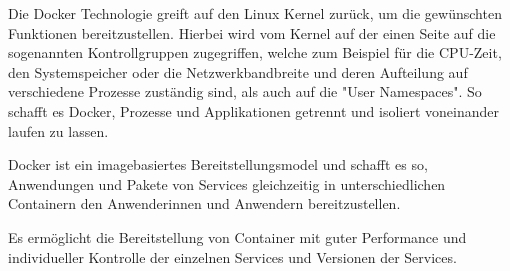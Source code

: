 \label{sec:dockerexplained}

Die Docker Technologie greift auf den Linux Kernel zurück, um die gewünschten Funktionen bereitzustellen. Hierbei wird vom Kernel auf der einen Seite auf die sogenannten Kontrollgruppen zugegriffen, welche zum Beispiel für die CPU-Zeit, den Systemspeicher oder die Netzwerkbandbreite und deren Aufteilung auf verschiedene Prozesse zuständig sind, als auch auf die "User Namespaces". So schafft es Docker, Prozesse und Applikationen getrennt und isoliert voneinander laufen zu lassen. \cite{Kontrollgruppen} \cite{DockerGrundlagen}

Docker ist ein imagebasiertes Bereitstellungsmodel und schafft es so, Anwendungen und Pakete von Services gleichzeitig in unterschiedlichen Containern den Anwenderinnen und Anwendern bereitzustellen. \cite{DockerGrundlagen}

Es ermöglicht die Bereitstellung von Container mit guter Performance und individueller Kontrolle der einzelnen Services und Versionen der Services. \cite{DockerGrundlagen}